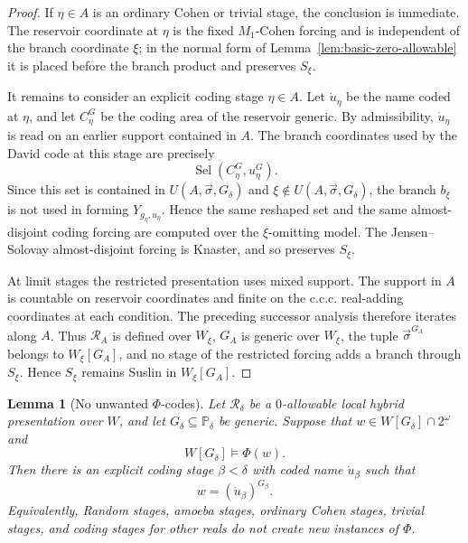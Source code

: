 \documentclass[a4paper,11pt]{article}
\newtheorem{lemma}[theorem]{Lemma}
\begin{document}
\begin{proof}
If \(\eta\in A\) is an ordinary Cohen or trivial stage, the conclusion is
immediate.  The reservoir coordinate at \(\eta\) is the fixed
\(M_1\)-Cohen forcing and is independent of the branch coordinate \(\xi\); in
the normal form of Lemma~\ref{lem:basic-zero-allowable} it is placed before the
branch product and preserves \(S_\xi\).

It remains to consider an explicit coding stage \(\eta\in A\).  Let
\(\dot u_\eta\) be the name coded at \(\eta\), and let \(C_\eta^G\) be the
coding area of the reservoir generic.  By admissibility, \(\dot u_\eta\) is
read on an earlier support contained in \(A\).  The branch coordinates used by
the David code at this stage are precisely
\[
   \operatorname{Sel}(C_\eta^G,u_\eta^G).
\]
Since this set is contained in \(U(A,\vec\sigma,G_\delta)\) and
\(\xi\notin U(A,\vec\sigma,G_\delta)\), the branch \(b_\xi\) is not used in
forming \(Y_{g_\eta,u_\eta}\).  Hence the same reshaped set and the same
almost-disjoint coding forcing are computed over the \(\xi\)-omitting model.
The Jensen--Solovay almost-disjoint forcing is Knaster, and so preserves
\(S_\xi\).

At limit stages the restricted presentation uses mixed support.  The support in
\(A\) is countable on reservoir coordinates and finite on the c.c.c. real-adding
coordinates at each condition.  The preceding successor analysis therefore
iterates along \(A\).  Thus \(\mathcal R_A\) is defined over \(W_\xi\),
\(G_A\) is generic over \(W_\xi\), the tuple \(\vec\sigma^{G_A}\) belongs to
\(W_\xi[G_A]\), and no stage of the restricted forcing adds a branch through
\(S_\xi\).  Hence \(S_\xi\) remains Suslin in \(W_\xi[G_A]\).
\end{proof}

\begin{lemma}[No unwanted \(\Phi\)-codes]\label{lem:no-unwanted-codes}
Let \(\mathcal R_\delta\) be a \(0\)-allowable local hybrid presentation over \(W\),
and let \(G_\delta\subseteq\mathbb P_\delta\) be generic.  Suppose
that \(w\in W[G_\delta]\cap 2^\omega\) and
\[
   W[G_\delta]\models \Phi(w).
\]
Then there is an explicit coding stage \(\beta<\delta\) with coded name
\(\dot u_\beta\) such that
\[
   w=(\dot u_\beta)^{G_\beta}.
\]
Equivalently, Random stages, amoeba stages, ordinary Cohen stages, trivial
stages, and coding stages for other reals do not create new instances of
\(\Phi\).
\end{lemma}
\end{document}
